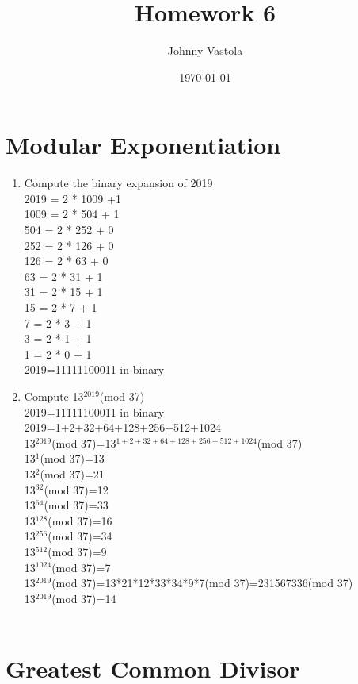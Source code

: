 \documentclass[12pt]{article}
\title{Homework 6}
\author{Johnny Vastola}
\date{\today}
\begin{document}
\maketitle
\section*{Modular Exponentiation}
\begin{enumerate}
\item Compute the binary expansion of 2019\\
2019 = 2 * 1009 +1\\
1009 = 2 * 504 + 1\\
504 = 2 * 252 + 0\\
252 = 2 * 126 + 0\\
126 = 2 * 63 + 0\\
63 = 2 * 31 + 1\\
31 = 2 * 15 + 1\\
15 = 2 * 7 + 1\\
7 = 2 * 3 + 1\\
3 = 2 * 1 + 1\\
1 = 2 * 0 + 1\\
2019=11111100011 in binary

\item Compute 13$^{2019}$(mod 37)\\
2019=11111100011 in binary\\
2019=1+2+32+64+128+256+512+1024\\
13$^{2019}$(mod 37)=13$^{1+2+32+64+128+256+512+1024}$(mod 37)\\
13$^{1}$(mod 37)=13\\
13$^{2}$(mod 37)=21\\
13$^{32}$(mod 37)=12\\
13$^{64}$(mod 37)=33\\
13$^{128}$(mod 37)=16\\
13$^{256}$(mod 37)=34\\
13$^{512}$(mod 37)=9\\
13$^{1024}$(mod 37)=7\\

13$^{2019}$(mod 37)=13*21*12*33*34*9*7(mod 37)=231567336(mod 37)\\
13$^{2019}$(mod 37)=14\\
\\
\end{enumerate}
\section*{Greatest Common Divisor}
\end{document}
